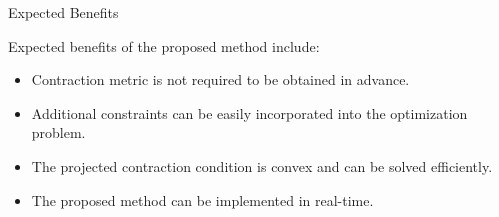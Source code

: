 \begin{frame}{\insertsubsectionhead}{Expected Benefits}

   Expected benefits of the proposed method include:

    \begin{itemize}
        \item Contraction metric is not required to be obtained in advance.
        \item Additional constraints can be easily incorporated into the optimization problem.
        \item The projected contraction condition is convex and can be solved efficiently.
        \item The proposed method can be implemented in real-time.
    \end{itemize}

\end{frame}